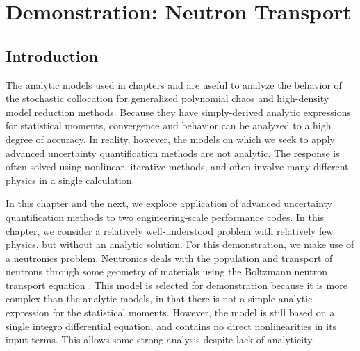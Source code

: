 
\chapter{Demonstration: Neutron Transport} %

\label{ch:c5g7} %



\section{Introduction}
The analytic models used in chapters \label{ch:results scgpc} and \label{ch:results hdmr} are useful to
analyze the behavior of the stochastic collocation for generalized polynomial chaos and high-density model
reduction methods.  Because they have simply-derived analytic expressions for statistical moments, convergence
and behavior can be analyzed to a high degree of accuracy.  In reality, however, the models on which we seek to apply
advanced uncertainty quantification methods are not analytic.  The response is often solved using nonlinear,
iterative methods, and often involve many different physics in a single calculation.

In this chapter and the next, we explore application of advanced uncertainty quantification methods to two
engineering-scale performance codes.  In this chapter, we consider a relatively well-understood problem with
relatively few physics, but without an analytic solution.  For this demonstration, we make use of a neutronics
problem.  Neutronics deals with the population and transport of neutrons through some geometry of materials
using the Boltzmann neutron transport equation \cite{lewistrans}. This model is selected for demonstration
because it is more complex than the analytic models, in that there is not a simple analytic expression for the
statistical moments.  However, the model is still based on a single integro differential equation, and
contains no direct nonlinearities in its input terms.  This allows some strong analysis despite lack of
analyticity.

